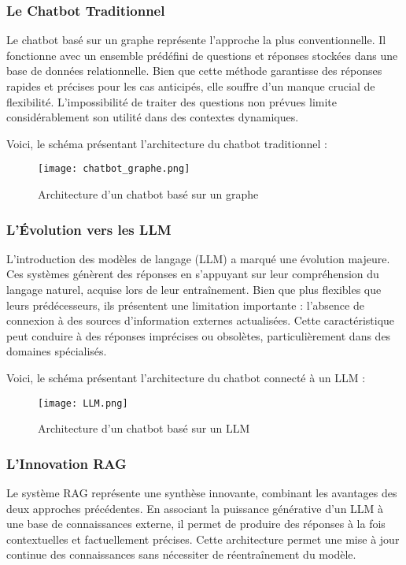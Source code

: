 \documentclass{article}
\begin{document}
\subsubsection{Le Chatbot Traditionnel}
Le chatbot basé sur un graphe représente l'approche la plus conventionnelle. Il fonctionne avec un ensemble prédéfini de questions et réponses stockées dans une base de données relationnelle. Bien que cette méthode garantisse des réponses rapides et précises pour les cas anticipés, elle souffre d'un manque crucial de flexibilité. L'impossibilité de traiter des questions non prévues limite considérablement son utilité dans des contextes dynamiques.

Voici, le schéma présentant l'architecture du chatbot traditionnel : 

\begin{figure}[ht]
    \centering
    \texttt{[image: chatbot\_graphe.png]}
    \caption{Architecture d’un chatbot basé sur un graphe}
\end{figure}

\subsubsection{L'Évolution vers les LLM}
L'introduction des modèles de langage (LLM) a marqué une évolution majeure. Ces systèmes génèrent des réponses en s'appuyant sur leur compréhension du langage naturel, acquise lors de leur entraînement. Bien que plus flexibles que leurs prédécesseurs, ils présentent une limitation importante : l'absence de connexion à des sources d'information externes actualisées. Cette caractéristique peut conduire à des réponses imprécises ou obsolètes, particulièrement dans des domaines spécialisés.

Voici, le schéma présentant l'architecture du chatbot connecté à un LLM : 
\begin{figure}[ht]
    \centering
    \texttt{[image: LLM.png]}
    \caption{Architecture d’un chatbot basé sur un LLM}
\end{figure}

\subsubsection{L'Innovation RAG}
Le système RAG représente une synthèse innovante, combinant les avantages des deux approches précédentes. En associant la puissance générative d'un LLM à une base de connaissances externe, il permet de produire des réponses à la fois contextuelles et factuellement précises. Cette architecture permet une mise à jour continue des connaissances sans nécessiter de réentraînement du modèle.
\end{document}
